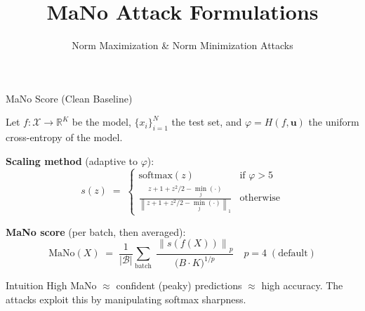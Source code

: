 \documentclass[aspectratio=169]{beamer}
\title[MaNo Attacks]{\textbf{MaNo Attack Formulations}}
\subtitle{Norm Maximization \& Norm Minimization Attacks}
\date{}
\newcommand{\norm}[2]{\left\|#1\right\|_{#2}}
\newcommand{\Phi}{\varphi}
\begin{document}
\begin{frame}
  \titlepage
\end{frame}

\begin{frame}{MaNo Score (Clean Baseline)}

Let $f : \mathcal{X} \to \mathbb{R}^K$ be the model, $\{x_i\}_{i=1}^N$ the test set,
and $\Phi = H(f, \mathbf{u})$ the uniform cross-entropy of the model.

\medskip
\textbf{Scaling method} (adaptive to $\Phi$):
\[
  s(z) \;=\;
  \begin{cases}
    \mathrm{softmax}(z) & \text{if } \Phi > 5 \\[4pt]
    \displaystyle
    \frac{z + 1 + z^{2}/2 - \min_j(\cdot)}
         {\norm{z + 1 + z^{2}/2 - \min_j(\cdot)}{1}}
    & \text{otherwise}
  \end{cases}
\]

\medskip
\textbf{MaNo score} (per batch, then averaged):
\[
  \boxed{
    \mathrm{MaNo}(X) \;=\;
    \frac{1}{|\mathcal{B}|}
    \sum_{\text{batch}} \;
    \frac{\norm{s(f(X))}{p}}{\bigl(B \cdot K\bigr)^{1/p}}
  }
  \quad p = 4 \;(\text{default})
\]

\smallskip
\begin{block}{Intuition}
  High MaNo $\approx$ confident (peaky) predictions $\approx$ high accuracy.
  The attacks exploit this by manipulating softmax sharpness.
\end{block}
\end{frame}
\end{document}
